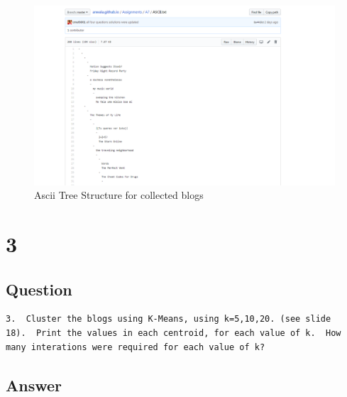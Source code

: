 \documentclass[letterpaper,11pt]{article}
\begin{document}
\begin{figure}[h]
 \centering
 \includegraphics[scale=0.26]{AsciiTreeStructure}
 \caption{Ascii Tree Structure for collected  blogs}
 \label{fig:asciiTreeStucture}
 \end{figure}

 

\clearpage


\section*{3}

\subsection*{Question}

\begin{verbatim}
3.  Cluster the blogs using K-Means, using k=5,10,20. (see slide
18).  Print the values in each centroid, for each value of k.  How
many interations were required for each value of k?
\end{verbatim}

\subsection*{Answer}
\end{document}
